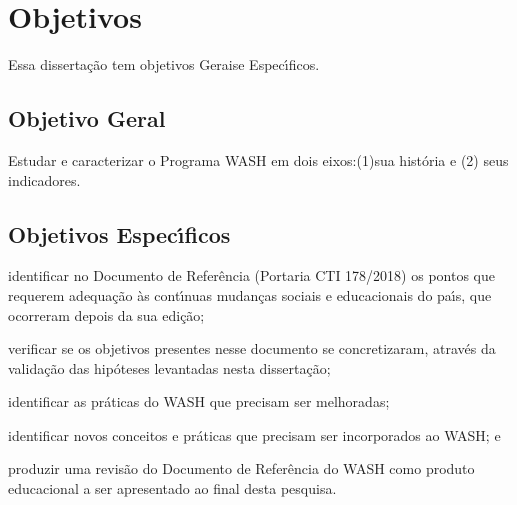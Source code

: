\documentclass[
12pt,		%
openright,	%
twoside,  %
a4paper,			%
chapter=TITLE,		%
english,			%
french,				%
spanish,			%
brazil				%
]{USPSC-classe/USPSC}
\begin{document}
\section[Objetivos]{Objetivos}\label{Objetivos}
Essa disserta\c{c}\~ao tem objetivos  \textquotedbl Gerais\textquotedbl  e \textquotedbl Espec\'{\i}ficos\textquotedbl .

















\subsection[Objetivo Geral]{Objetivo Geral}\label{Objetivo Geral}
Estudar e caracterizar o Programa WASH em dois eixos:(1)sua hist\'oria e (2) seus indicadores.

















\subsection[Objetivos Espec\'{\i}ficos]{Objetivos Espec\'{\i}ficos}\label{Objetivos Espec\'{\i}ficos}



















\begin{alineas}
\item identificar no Documento de Refer\^encia (Portaria CTI 178/2018) os pontos que requerem adequa\c{c}\~ao \`as cont\'{\i}nuas mudan\c{c}as sociais e educacionais do pa\'{\i}s, que ocorreram depois da sua edi\c{c}\~ao;
\item verificar se os objetivos presentes nesse documento se concretizaram, atrav\'es da valida\c{c}\~ao das hip\'oteses levantadas nesta disserta\c{c}\~ao;
\item identificar as pr\'aticas do WASH que precisam ser melhoradas;
\item identificar novos conceitos e pr\'aticas que precisam ser incorporados ao WASH; e
\item produzir uma revis\~ao do Documento de Refer\^encia do WASH como produto educacional a ser apresentado ao final desta pesquisa.
\end{alineas}
\end{document}
